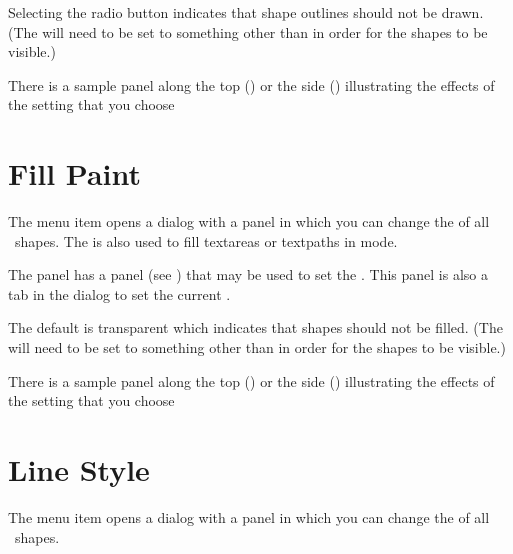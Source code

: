 Selecting the  radio button indicates
that \gls{shape} outlines should not be drawn.  (The 
will need to be set to something other than
 in order for the \glspl{shape} to be
visible.)

There is a sample panel along the top ()
or the side () illustrating the
effects of the  setting that you choose

\section{Fill Paint}\label{sec:fillpaint}


The  menu item opens a dialog with a
 panel in which you can change the
 of all \selected\
\glspl{shape}. The  is also used to fill
\glspl{textarea} or \glspl{textpath} in  mode. 


The  panel has a  panel (see
\sectionref{sec:paint}) that may be used to set the
. This panel is also a tab in the
 dialog to set the current .

The default  is \gls{transparent} which indicates
that \glspl{shape} should not be filled.  (The \pathattr{line-paint}
will need to be set to something other than
 in order for the \glspl{shape} to be
visible.)

There is a sample panel along the top ()
or the side () illustrating the
effects of the  setting that you choose


\section{Line Style}\label{sec:pathstyle}


The  menu item opens a dialog
with a  panel in which
you can change the  
of all \selected\ \glspl{shape}.

